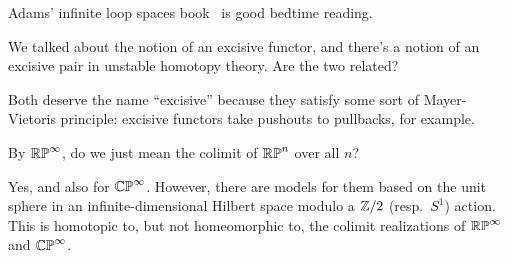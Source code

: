 Adams' infinite loop spaces book~\cite{InfiniteLoopSpaces} is good bedtime reading.
\begin{ques}
We talked about the notion of an excisive functor, and there's a notion of an excisive pair in unstable homotopy
theory. Are the two related?
\end{ques}
Both deserve the name ``excisive'' because they satisfy some sort of Mayer-Vietoris principle: excisive functors
take pushouts to pullbacks, for example.
\begin{ques}
By $\mathbb{RP}^\infty$, do we just mean the colimit of $\mathbb{RP}^n$ over all $n$?
\end{ques}
Yes, and also for $\mathbb{CP}^\infty$. However, there are models for them based on the unit sphere in an
infinite-dimensional Hilbert space modulo a $\mathbb Z/2$ (resp.\ $S^1$) action. This is homotopic to, but not
homeomorphic to, the colimit realizations of $\mathbb{RP}^\infty$ and $\mathbb{CP}^\infty$.


